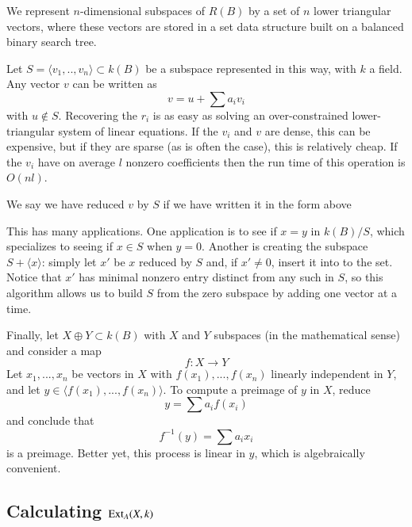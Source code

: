 We represent $n$-dimensional subspaces of $R(B)$ by a set of $n$ lower triangular vectors, 
where these vectors are stored in a set data structure built on a balanced binary search tree.  

Let $S=\langle v_1,..,v_n\rangle\subset k(B)$ be a subspace represented in this way, with $k$ a field.  
Any vector $v$ can be written as
\[v=u+\sum a_i v_i\]
with $u\notin S$.  
Recovering the $r_i$ is as easy as solving an over-constrained lower-triangular system of linear equations.  
If the $v_i$ and $v$ are dense, this can be expensive, but if they are sparse (as is often the case), this is relatively cheap.
If the $v_i$ have on average $l$ nonzero coefficients then the run time of this operation is $O(nl)$. 
\begin{Def}
  We say we have reduced $v$ by $S$ if we have written it in the form above
\end{Def}

This has many applications.  
One application is to see if $x=y$ in $k(B)/S$, which specializes to seeing if $x\in S$ when $y=0$.
Another is creating the subspace $S + \langle x\rangle$: simply let $x'$ be $x$ reduced by $S$ and, if $x'\ne 0$, insert it into to the set.
Notice that $x'$ has minimal nonzero entry distinct from any such in $S$, so this algorithm allows us to build $S$ from the zero subspace by adding one vector at a time.

Finally, let $X\oplus Y\subset k(B)$ with $X$ and $Y$ subspaces (in the mathematical sense) and consider a map
\[f: X\to Y\]
Let $x_1,...,x_n$ be vectors in $X$ with $f(x_1),...,f(x_n)$ linearly independent in $Y$, and let $y\in \langle f(x_1),...,f(x_n)\rangle$.
To compute a preimage of $y$ in $X$, reduce 
\[y=\sum a_i f(x_i)\]
and conclude that
\[f^{-1}(y)=\sum a_i x_i\]
is a preimage.
Better yet, this process is linear in $y$, which is algebraically convenient.  


\subsection{Calculating $\operatorname{Ext}\nolimits_A(X,k)$}

